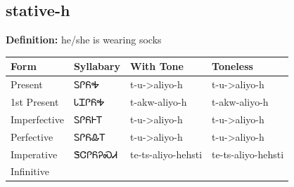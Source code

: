 \documentclass{article}%
\begin{document}
\subsection*{stative-h}%
\textbf{Definition: }%
he/she is wearing socks%
\\[0.5em]%
\begin{tabular}{|l|l|l|l|}%
\hline%
\textbf{Form}&\textbf{Syllabary}&\textbf{With Tone}&\textbf{Toneless}\\%
\hline%
Present&ᏚᎵᏲᎭ&t{-}u{-}>aliyo{-}h&t{-}u{-}>aliyo{-}h\\%
1st Present&ᏓᏆᎵᏲᎭ&t{-}akw{-}aliyo{-}h&t{-}akw{-}aliyo{-}h\\%
Imperfective&ᏚᎵᏲᎰᎢ&t{-}u{-}>aliyo{-}h&t{-}u{-}>aliyo{-}h\\%
Perfective&ᏚᎵᏲᎲᎢ&t{-}u{-}>aliyo{-}h&t{-}u{-}>aliyo{-}h\\%
Imperative&ᏕᏣᎵᏲᎮᏍᏗ&te{-}ts{-}aliyo{-}hehsti&te{-}ts{-}aliyo{-}hehsti\\%
Infinitive&&&\\%
\hline%
\end{tabular}%
\\[1em]%
\end{document}
